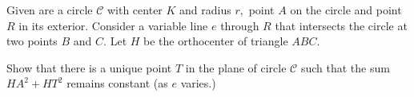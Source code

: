 Given are a circle $\mathcal{C}$ with center $K$ and radius $r,$ point  $A$ on the circle and point $R$ in its exterior. Consider a variable line $e$ through $R$ that intersects the circle at two points $B$ and $C.$  Let $H$ be the orthocenter of triangle $ABC.$

Show that there is a unique point $T$ in the plane of circle $\mathcal{C}$ such that the sum $HA^2 + HT^2$ remains constant (as $e$ varies.)